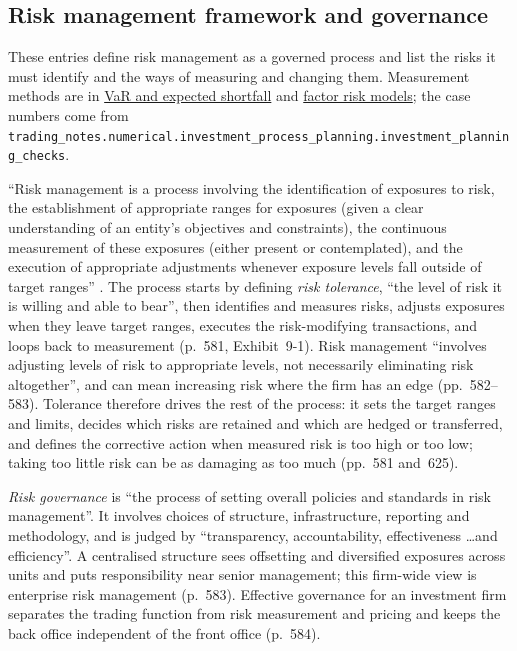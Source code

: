 \subsection{Risk management framework and governance}

These entries define risk management as a governed process and list the risks it must identify and the ways of measuring and changing them. Measurement methods are in \hyperref[meth:var-es-estimation-methods]{VaR and expected shortfall} and \hyperref[mod:factor-risk-model]{factor risk models}; the case numbers come from \nolinkurl{trading_notes.numerical.investment_process_planning.investment_planning_checks}.

\begin{qfdefinition}\label{def:risk-management-framework}
 ``Risk management is a process involving the identification of exposures to risk, the establishment of appropriate ranges for exposures (given a clear understanding of an entity's objectives and constraints), the continuous measurement of these exposures (either present or contemplated), and the execution of appropriate adjustments whenever exposure levels fall outside of target ranges'' \citep[chap.~9 (Chance, Grant and Marsland), p.~580]{managing-investment-portfolios-2007}. The process starts by defining \emph{risk tolerance}, ``the level of risk it is willing and able to bear'', then identifies and measures risks, adjusts exposures when they leave target ranges, executes the risk-modifying transactions, and loops back to measurement (p.~581, Exhibit~9-1). Risk management ``involves adjusting levels of risk to appropriate levels, not necessarily eliminating risk altogether'', and can mean increasing risk where the firm has an edge (pp.~582--583). Tolerance therefore drives the rest of the process: it sets the target ranges and limits, decides which risks are retained and which are hedged or transferred, and defines the corrective action when measured risk is too high or too low; taking too little risk can be as damaging as too much (pp.~581 and~625).

\emph{Risk governance} is ``the process of setting overall policies and standards in risk management''. It involves choices of structure, infrastructure, reporting and methodology, and is judged by ``transparency, accountability, effectiveness \ldots and efficiency''. A centralised structure sees offsetting and diversified exposures across units and puts responsibility near senior management; this firm-wide view is enterprise risk management (p.~583). Effective governance for an investment firm separates the trading function from risk measurement and pricing and keeps the back office independent of the front office (p.~584).


\end{qfdefinition}

